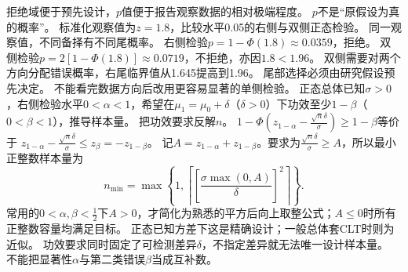 {拒绝域便于预先设计，$p$值便于报告观察数据的相对极端程度。}
{$p$不是“原假设为真的概率”。}
{标准化观察值为$z=1.8$，比较水平0.05的右侧与双侧正态检验。}
{同一观察值，不同备择有不同尾概率。}
{右侧检验$p=1-\Phi(1.8)\approx0.0359$，拒绝。
双侧检验$p=2[1-\Phi(1.8)]\approx0.0719$，不拒绝，亦因$1.8<1.96$。
双侧需要对两个方向分配错误概率，右尾临界值从1.645提高到1.96。}
{尾部选择必须由研究假设预先决定。}
{不能看完数据方向后改用更容易显著的单侧检验。}
{正态总体已知$\sigma>0$，右侧检验水平$0<\alpha<1$，希望在$\mu_1=\mu_0+\delta$（$\delta>0$）下功效至少$1-\beta$（$0<\beta<1$），推导样本量。}
{把功效要求反解$n$。}
{$1-\Phi(z_{1-\alpha}-\frac{\sqrt n\delta}{\sigma})\ge1-\beta$等价于
$z_{1-\alpha}-\frac{\sqrt n\delta}{\sigma}\le z_\beta=-z_{1-\beta}$。
记$A=z_{1-\alpha}+z_{1-\beta}$。要求为$\frac{\sqrt n\delta}{\sigma}\ge A$，所以最小正整数样本量为
\[n_{\min}=\max\!\left\{1,\left\lceil\left[\dfrac{\sigma\max(0,A)}\delta\right]^2\right\rceil\right\}.\]
常用的$0<\alpha,\beta<\frac{1}{2}$下$A>0$，才简化为熟悉的平方后向上取整公式；$A\le0$时所有正整数容量均满足目标。
正态已知方差下这是精确设计；一般总体套CLT时则为近似。}
{功效要求同时固定了可检测差异$\delta$，不指定差异就无法唯一设计样本量。}
{不能把显著性$\alpha$与第二类错误$\beta$当成互补数。}

